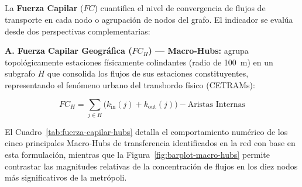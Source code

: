 \subsection{}
\label{subsec:fuerza-capilar}

La \textbf{Fuerza Capilar} ($FC$) cuantifica el nivel de convergencia de flujos
de transporte en cada nodo o agrupación de nodos del grafo. El indicador se
evalúa desde dos perspectivas complementarias:

\textbf{A. Fuerza Capilar Geográfica ($FC_H$) — Macro-Hubs:} agrupa
topológicamente estaciones físicamente colindantes (radio de 100~m) en un
subgrafo $H$ que consolida los flujos de sus estaciones constituyentes,
representando el fenómeno urbano del transbordo físico (CETRAMs):

\begin{equation}
    FC_{H} = \sum_{j \in H} \bigl(k_{\text{in}}(j) + k_{\text{out}}(j)\bigr)
    - \text{Aristas Internas}
    \label{eq:fc-geografica}
\end{equation}

El Cuadro~\ref{tab:fuerza-capilar-hubs} detalla el comportamiento numérico de
los cinco principales Macro-Hubs de transferencia identificados en la red con
base en esta formulación, mientras que la Figura~\ref{fig:barplot-macro-hubs}
permite contrastar las magnitudes relativas de la concentración de flujos en los
diez nodos más significativos de la metrópoli.

